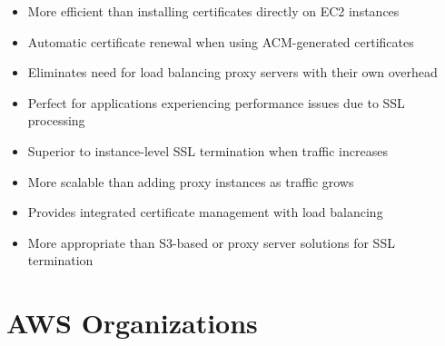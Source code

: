 \documentclass[11pt,a4paper]{report}
\begin{document}
\begin{itemize}
\begin{itemize}
  \item More efficient than installing certificates directly on EC2 instances
  \item Automatic certificate renewal when using ACM-generated certificates
  \item Eliminates need for load balancing proxy servers with their own overhead
  \item Perfect for applications experiencing performance issues due to SSL processing
  \item Superior to instance-level SSL termination when traffic increases
  \item More scalable than adding proxy instances as traffic grows
  \item Provides integrated certificate management with load balancing
  \item More appropriate than S3-based or proxy server solutions for SSL termination
\end{itemize}
\end{itemize}


\section{AWS Organizations}
\end{document}
